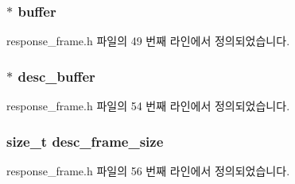 \subsubsection[{\texorpdfstring{buffer}{buffer}}]{$\ast$ buffer}\hypertarget{classavdecc__lib_1_1response__frame_a56ed84df35de10bdb65e72b184309497}{}\label{classavdecc__lib_1_1response__frame_a56ed84df35de10bdb65e72b184309497}


response\+\_\+frame.\+h 파일의 49 번째 라인에서 정의되었습니다.

\subsubsection[{\texorpdfstring{desc\+\_\+buffer}{desc_buffer}}]{$\ast$ desc\+\_\+buffer}\hypertarget{classavdecc__lib_1_1response__frame_a475e9644bebeea82b09dc6a2f054fe18}{}\label{classavdecc__lib_1_1response__frame_a475e9644bebeea82b09dc6a2f054fe18}


response\+\_\+frame.\+h 파일의 54 번째 라인에서 정의되었습니다.

\subsubsection[{\texorpdfstring{desc\+\_\+frame\+\_\+size}{desc_frame_size}}]{\setlength{\rightskip}{0pt plus 5cm}size\+\_\+t desc\+\_\+frame\+\_\+size}\hypertarget{classavdecc__lib_1_1response__frame_a97d6f0632c5fa3311d63c077d77e42b4}{}\label{classavdecc__lib_1_1response__frame_a97d6f0632c5fa3311d63c077d77e42b4}


response\+\_\+frame.\+h 파일의 56 번째 라인에서 정의되었습니다.


